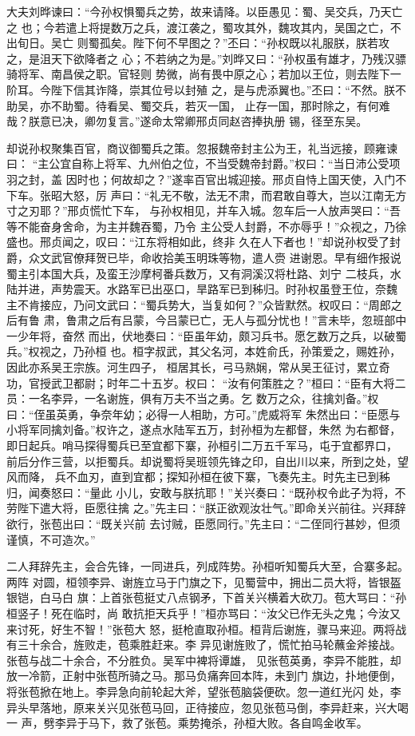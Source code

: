 大夫刘晔谏曰：“今孙权惧蜀兵之势，故来请降。以臣愚见：蜀、吴交兵，乃天亡之
也；今若遣上将提数万之兵，渡江袭之，蜀攻其外，魏攻其内，吴国之亡，不出旬日。吴亡
则蜀孤矣。陛下何不早图之？”丕曰：“孙权既以礼服朕，朕若攻之，是沮天下欲降者之
心；不若纳之为是。”刘晔又曰：“孙权虽有雄才，乃残汉骠骑将军、南昌侯之职。官轻则
势微，尚有畏中原之心；若加以王位，则去陛下一阶耳。今陛下信其诈降，崇其位号以封殖
之，是与虎添翼也。”丕曰：“不然。朕不助吴，亦不助蜀。待看吴、蜀交兵，若灭一国，
止存一国，那时除之，有何难哉？朕意已决，卿勿复言。”遂命太常卿邢贞同赵咨捧执册
锡，径至东吴。

却说孙权聚集百官，商议御蜀兵之策。忽报魏帝封主公为王，礼当远接，顾雍谏曰：
“主公宜自称上将军、九州伯之位，不当受魏帝封爵。”权曰：“当日沛公受项羽之封，盖
因时也；何故却之？”遂率百官出城迎接。邢贞自恃上国天使，入门不下车。张昭大怒，厉
声曰：“礼无不敬，法无不肃，而君敢自尊大，岂以江南无方寸之刃耶？”邢贞慌忙下车，
与孙权相见，并车入城。忽车后一人放声哭曰：“吾等不能奋身舍命，为主并魏吞蜀，乃令
主公受人封爵，不亦辱乎！”众视之，乃徐盛也。邢贞闻之，叹曰：“江东将相如此，终非
久在人下者也！”却说孙权受了封爵，众文武官僚拜贺已毕，命收拾美玉明珠等物，遣人赍
进谢恩。早有细作报说蜀主引本国大兵，及蛮王沙摩柯番兵数万，又有洞溪汉将杜路、刘宁
二枝兵，水陆并进，声势震天。水路军已出巫口，旱路军已到秭归。时孙权虽登王位，奈魏
主不肯接应，乃问文武曰：“蜀兵势大，当复如何？”众皆默然。权叹曰：“周郎之后有鲁
肃，鲁肃之后有吕蒙，今吕蒙已亡，无人与孤分忧也！”言未毕，忽班部中一少年将，奋然
而出，伏地奏曰：“臣虽年幼，颇习兵书。愿乞数万之兵，以破蜀兵。”权视之，乃孙桓
也。桓字叔武，其父名河，本姓俞氏，孙策爱之，赐姓孙，因此亦系吴王宗族。河生四子，
桓居其长，弓马熟娴，常从吴王征讨，累立奇功，官授武卫都尉；时年二十五岁。权曰：
“汝有何策胜之？”桓曰：“臣有大将二员：一名李异，一名谢旌，俱有万夫不当之勇。乞
数万之众，往擒刘备。”权曰：“侄虽英勇，争奈年幼；必得一人相助，方可。”虎威将军
朱然出曰：“臣愿与小将军同擒刘备。”权许之，遂点水陆军五万，封孙桓为左都督，朱然
为右都督，即日起兵。哨马探得蜀兵已至宜都下寨，孙桓引二万五千军马，屯于宜都界口，
前后分作三营，以拒蜀兵。却说蜀将吴班领先锋之印，自出川以来，所到之处，望风而降，
兵不血刃，直到宜都；探知孙桓在彼下寨，飞奏先主。时先主已到秭归，闻奏怒曰：“量此
小儿，安敢与朕抗耶！”关兴奏曰：“既孙权令此子为将，不劳陛下遣大将，臣愿往擒
之。”先主曰：“朕正欲观汝壮气。”即命关兴前往。兴拜辞欲行，张苞出曰：“既关兴前
去讨贼，臣愿同行。”先主曰：“二侄同行甚妙，但须谨慎，不可造次。”

二人拜辞先主，会合先锋，一同进兵，列成阵势。孙桓听知蜀兵大至，合寨多起。两阵
对圆，桓领李异、谢旌立马于门旗之下，见蜀营中，拥出二员大将，皆银盔银铠，白马白
旗：上首张苞挺丈八点钢矛，下首关兴横着大砍刀。苞大骂曰：“孙桓竖子！死在临时，尚
敢抗拒天兵乎！”桓亦骂曰：“汝父已作无头之鬼；今汝又来讨死，好生不智！”张苞大
怒，挺枪直取孙桓。桓背后谢旌，骤马来迎。两将战有三十余合，旌败走，苞乘胜赶来。李
异见谢旌败了，慌忙拍马轮蘸金斧接战。张苞与战二十余合，不分胜负。吴军中裨将谭雄，
见张苞英勇，李异不能胜，却放一冷箭，正射中张苞所骑之马。那马负痛奔回本阵，未到门
旗边，扑地便倒，将张苞掀在地上。李异急向前轮起大斧，望张苞脑袋便砍。忽一道红光闪
处，李异头早落地，原来关兴见张苞马回，正待接应，忽见张苞马倒，李异赶来，兴大喝一
声，劈李异于马下，救了张苞。乘势掩杀，孙桓大败。各自鸣金收军。

